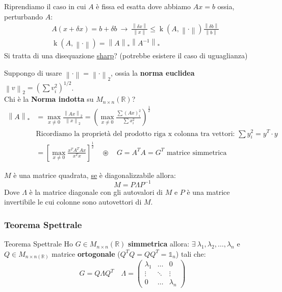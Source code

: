 \documentclass{article}
\begin{document}
Riprendiamo il caso in cui $A$ è fissa ed esatta dove abbiamo $Ax=b$ ossia, perturbando $A$:
\begin{align*}
     & A\left(x+\delta x\right)=b+\delta b\ \to\ \frac{\left\|\delta x\right\|}{\left\|x\right\|}\le\operatorname{k}(A,\left\|\cdot\right\|)\frac{\left\|\delta b\right\|}{\left\|b\right\|} \\
     & \operatorname{k}(A,\left\|\cdot\right\|)=\left\|A\right\|_*\left\|A^{-1}\right\|_*
\end{align*}
Si tratta di una disequazione \underline{sharp}?  (potrebbe esistere il caso di uguaglianza)

Suppongo di usare $\left\|\cdot\right\|=\left\|\cdot\right\|_2$, ossia la \textbf{norma euclidea} $\left\|v\right\|_2=\left(\sum v_i^2\right)^{1/2}$.\\
Chi è la \textbf{Norma indotta} su $M_{n\times n}(\mathbb R)$?
\begin{align*}
    \left\|A\right\|_* & =\max_{x\ne 0}\frac{\left\|Ax\right\|_2}{\left\|x\right\|_2}=\left(\max_{x\ne 0}\frac{\sum\left(Ax\right)^2_i}{\sum x^2_i}\right)^{\frac 12} \\
                       & \text{Ricordiamo la proprietà del prodotto riga x colonna tra vettori: }\boxed{\sum y^2_i=y^T\cdot y}                                        \\
                       & =\left[\max_{x\ne0}\frac{x^TA^TAx}{x^Tx}\right]^{\frac 12}\quad\circledast\quad G=A^TA=G^T\text{ matrice simmetrica}
\end{align*}
\begin{note}{}{}
    $M$ è una matrice quadrata, \underline{se} è diagonalizzabile allora:$$M=P\Lambda P^{-1}$$
    Dove $\Lambda$ è la matrice diagonale con gli autovalori di $M$ e $P$ è una matrice invertibile le cui colonne sono autovettori di $M$.
\end{note}

\subsubsection{Teorema Spettrale}
\begin{theo}{Teorema Spettrale}{}
    Ho $G\in M_{n\times n}(\mathbb R)$ \textbf{simmetrica} allora: $\exists\ \lambda_1,\lambda_2,\dots,\lambda_n$
    e $Q\in M_{n\times n(\mathbb R)}$ matrice \textbf{ortogonale} ($Q^TQ=QQ^T=\mathbb 1_n$) tali che:
    $$\boxed{G=Q\Lambda Q^T}\quad \Lambda=\begin{pmatrix}
            \lambda_1 & \dots  & 0         \\
            \vdots    & \ddots & \vdots    \\
            0         & \dots  & \lambda_n
        \end{pmatrix}$$
\end{theo}
\end{document}
